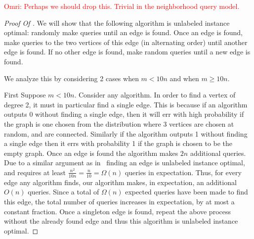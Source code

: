 \documentclass[11pt]{article}
\numberwithin{equation}{section}
\newcommand{\1}{\mathbf{1}}
\newcommand\omri[1]{{\textcolor{red}{Omri: #1}}}
\begin{document}
\iffalse
\omri{Perhaps we should drop this. Trivial in the neighborhood query model.}
\begin{proof}[Proof Of ]
We will show that the following algorithm is unlabeled instance optimal: randomly make queries until an edge is found. Once an edge is found, make queries to the two vertices of this edge (in alternating order) until another edge is found. If no other edge is found, make random queries until a new edge is found. 

We analyze this by considering 2 cases when $m < 10n$ and when $m \ge 10n$.

First Suppose $ m <10n$. Consider any algorithm. In order to find a vertex of degree 2, it must in particular find a single edge. This is because if an algorithm outputs 0 without finding a single edge, then it will err with high probability if the graph is one chosen from the distribution where 3 vertices are chosen at random, and are connected. Similarly if the algorithm outputs 1 without finding a single edge then it errs with probability 1 if the graph is chosen to be the empty graph. Once an edge is found the algorithm makes $2n$ additional queries. Due to a similar argument as in~ finding an edge is unlabeled instance optimal, and requires at least $\frac{n^2}{10n} = \frac{n}{10} = \Omega(n)$ queries in expectation. Thus, for every edge any algorithm finds, our algorithm makes, in expectation, an additional $O(n)$ queries.  Since a total of $\Omega(n)$ expected queries have been made to find this edge, the total number of queries increases in expectation, by at most a constant fraction. Once a singleton edge is found, repeat the above process without the already found edge and thus this algorithm is unlabeled instance optimal.


\end{proof}
\end{document}
